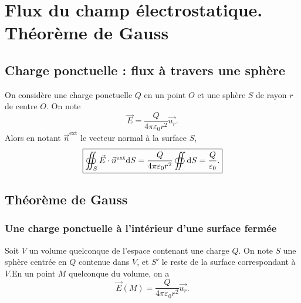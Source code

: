 \section[Flux du champ électrostatique]{Flux du champ électrostatique.\\Théorème de Gauss}

    \subsection{Charge ponctuelle : flux à travers une sphère}

        On considère une charge ponctuelle $Q$ en un point $O$ et une sphère $S$ de rayon $r$ de centre $O$. On note
        \begin{equation}
            \vec{E}=\frac{Q}{4\pi\varepsilon_{0}r^{2}}\vec{u_r}.
        \end{equation}
        Alors en notant $\vec{n}^{\text{ext}}$ le vecteur normal à la surface $S$,
        \begin{equation}
            \boxed{
                \oiint_{S}\vec{E}\cdot\vec{n}^{\text{ext}}\mathrm{d} S=\frac{Q}{4\pi\varepsilon_{0}r^{2}}\oiint\mathrm{d} S=\frac{Q}{\varepsilon_{0}}.
            }
        \end{equation}

    \subsection{Théorème de Gauss}
        \subsubsection{Une charge ponctuelle à l'intérieur d'une surface fermée}

            Soit $V$ un volume quelconque de l'espace contenant une charge $Q$. On note $S$ une sphère centrée en $Q$ contenue dans $V$, et $S'$ le reste de la surface correspondant à $V$.En un point $M$ quelconque du volume, on a
            \begin{equation}
                \vec{E}(M)=\frac{Q}{4\pi\varepsilon_{0}r^{2}}\vec{u_r}.
            \end{equation}

